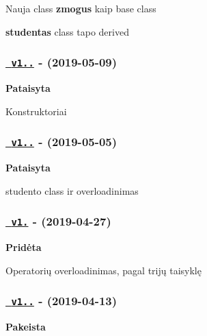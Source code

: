 \begin{DoxyItemize}
\item Nauja class {\bfseries{zmogus}} kaip base class
\item {\bfseries{studentas}} class tapo derived
\end{DoxyItemize}

\subsubsection*{\href{https://github.com/ToNyHasK/VUObjektinisNO3/releases/tag/v1.2.2}{\texttt{ v1..}} -\/ (2019-\/05-\/09)}

{\bfseries{Pataisyta}}


\begin{DoxyItemize}
\item Konstruktoriai
\end{DoxyItemize}

\subsubsection*{\href{https://github.com/ToNyHasK/VUObjektinisNO3/releases/tag/v1.2.1}{\texttt{ v1..}} -\/ (2019-\/05-\/05)}

{\bfseries{Pataisyta}}


\begin{DoxyItemize}
\item studento class ir overloadinimas
\end{DoxyItemize}

\subsubsection*{\href{https://github.com/ToNyHasK/VUObjektinisNO3/releases/tag/v1.2}{\texttt{ v1.}} -\/ (2019-\/04-\/27)}

{\bfseries{Pridėta}}


\begin{DoxyItemize}
\item Operatorių overloadinimas, pagal trijų taisyklę
\end{DoxyItemize}

\subsubsection*{\href{https://github.com/ToNyHasK/VUObjektinisNO3/releases/tag/v1.1.1}{\texttt{ v1..}} -\/ (2019-\/04-\/13)}

{\bfseries{Pakeista}}



